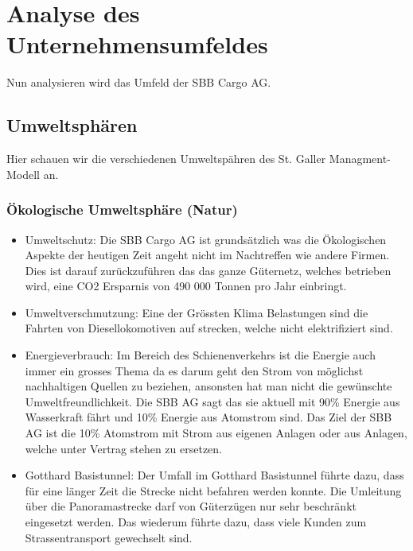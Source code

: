 \documentclass{article}
\begin{document}
\section{Analyse des Unternehmensumfeldes}

Nun analysieren wird das Umfeld der SBB Cargo AG.

\subsection{Umweltsphären}

Hier schauen wir die verschiedenen Umweltspähren des St. Galler Managment-Modell an.

\subsubsection{Ökologische Umweltsphäre (Natur)}

\begin{itemize}
\item Umweltschutz:
Die SBB Cargo AG ist grundsätzlich was die Ökologischen Aspekte der heutigen Zeit angeht nicht im Nachtreffen wie andere Firmen.
Dies ist darauf zurückzuführen das das ganze Güternetz, welches betrieben wird, eine CO2 Ersparnis von 490 000 Tonnen pro Jahr einbringt.

\item Umweltverschmutzung:
Eine der Grössten Klima Belastungen sind die Fahrten von Diesellokomotiven auf strecken, welche nicht elektrifiziert sind.   

\item Energieverbrauch: Im Bereich des Schienenverkehrs ist die Energie auch immer ein grosses Thema da es darum geht den Strom von möglichst nachhaltigen Quellen zu beziehen, ansonsten hat man nicht die gewünschte Umweltfreundlichkeit. 
Die SBB AG sagt das sie aktuell mit 90\% Energie aus Wasserkraft fährt und 10\% Energie aus Atomstrom sind. Das Ziel der SBB AG ist die 10\% Atomstrom mit Strom aus eigenen Anlagen oder aus Anlagen, welche unter Vertrag stehen zu ersetzen.
\item Gotthard Basistunnel:
Der Umfall im Gotthard Basistunnel führte dazu, dass für eine länger Zeit die Strecke nicht befahren werden konnte.
Die Umleitung über die Panoramastrecke darf von Güterzügen nur sehr beschränkt eingesetzt werden.
Das wiederum führte dazu, dass viele Kunden zum Strassentransport gewechselt sind.
\end{itemize}
\end{document}

